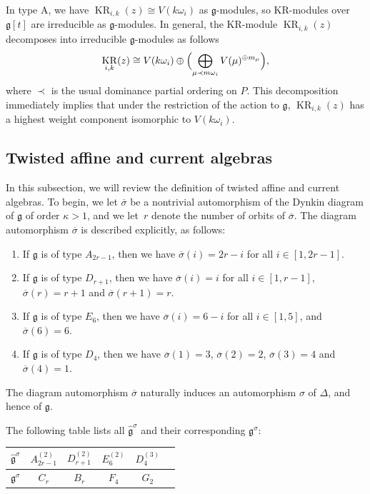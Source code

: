 \documentclass[pdftex]{sigma}
\numberwithin{equation}{section}
\DeclareMathOperator{\KR}{KR}
\begin{document}
In type A, we have $\KR_{i,k}(z)\cong V(k\omega_i)$ as $\mathfrak{g}$-modules, so KR-modules over $\mathfrak{g}[t]$ are irreducible as $\mathfrak{g}$-modules. In general, the KR-module $\KR_{i,k}(z)$ decomposes into irreducible $\mathfrak{g}$-modules as follows \cite{Chari01}
\[
\KR_{i,k}(z)\cong V(k\omega_i)\oplus\Bigl(\bigoplus_{\mu\prec m\omega_i}V(\mu)^{\oplus m_{\mu}}\Bigr),
\]
where $\prec$ is the usual dominance partial ordering on $P$. This decomposition immediately implies that under the restriction of the action to $\mathfrak{g}$, $\KR_{i,k}(z)$ has a highest weight component isomorphic to $V(k\omega_i)$.

\subsection{Twisted affine and current algebras}\label{Section 2.4}

In this subsection, we will review the definition of twisted affine and current algebras. To begin, we let $\overline{\sigma}$ be a nontrivial automorphism of the Dynkin diagram of $\mathfrak{g}$ of order $\kappa>1$, and we let~$r$ denote the number of orbits of $\overline{\sigma}$. The diagram automorphism $\overline{\sigma}$ is described explicitly, as follows:{\samepage
\begin{enumerate}\itemsep=0pt
\item[(1)] If $\mathfrak{g}$ is of type $A_{2r-1}$, then we have $\overline{\sigma}(i)=2r-i$ for all $i\in[1,2r-1]$.
\item[(2)] If $\mathfrak{g}$ is of type $D_{r+1}$, then we have $\overline{\sigma}(i)=i$ for all $i\in[1,r-1]$, $\overline{\sigma}(r)=r+1$ and $\overline{\sigma}(r+1)=r$.
\item[(3)] If $\mathfrak{g}$ is of type $E_6$, then we have $\overline{\sigma}(i)=6-i$ for all $i\in[1,5]$, and $\overline{\sigma}(6)=6$.
\item[(4)] If $\mathfrak{g}$ is of type $D_4$, then we have $\overline{\sigma}(1)=3$, $\overline{\sigma}(2)=2$, $\overline{\sigma}(3)=4$ and $\overline{\sigma}(4)=1$.
\end{enumerate}
The diagram automorphism $\overline{\sigma}$ naturally induces an automorphism $\sigma$ of $\Delta$, and hence of $\mathfrak{g}$.}

{\samepage The following table lists all $\widehat{\mathfrak{g}}^{\sigma}$ and their corresponding $\mathfrak{g}^{\sigma}$:
\begin{center}\renewcommand{\arraystretch}{1.2}
 \begin{tabular}{|c|c|c|c|c|c|}
 \hline
 $\widehat{\mathfrak{g}}^{\sigma}$ & $A_{2r-1}^{(2)}$ & $D_{r+1}^{(2)}$ & $E_{6}^{(2)}$ & $D_4^{(3)}$ \\ \hline
 $\mathfrak{g}^{\sigma}$ & $C_r$ & $B_r$ & $F_4$ & $G_2$ \\
 \hline
 \end{tabular}
\end{center}

}
\end{document}
